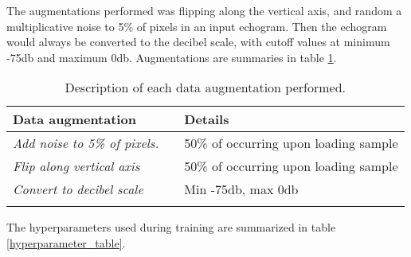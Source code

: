         The augmentations performed was flipping along the vertical axis, and random a multiplicative noise to 5\% of pixels in an input echogram. Then the echogram would always be converted to the decibel scale, with cutoff values at minimum -75db and maximum 0db. Augmentations are summaries in table \ref{data_augmentation_table}.
        
        \begin{longtable}{lll}

            \caption[Data augmentation summary]{Description of each data augmentation performed.}
            \\\hline
            \multicolumn{2}{|l|}{\textbf{Data augmentation}} & \multicolumn{1}{l|}{\textbf{Details}} \\ \hline
            \endfirsthead
            \endhead
            \textit{Add noise to 5\% of pixels.}      &       & 50\% of occurring upon loading sample \\ \hline
            \textit{Flip along vertical axis}        &       & 50\% of occurring upon loading sample \\ \hline
            \textit{Convert to decibel scale}        &       & Min -75db, max 0db                    \\ \hline
            \label{data_augmentation_table}
        \end{longtable}
        
        The hyperparameters used during training are summarized in table \ref{hyperparameter_table}.

